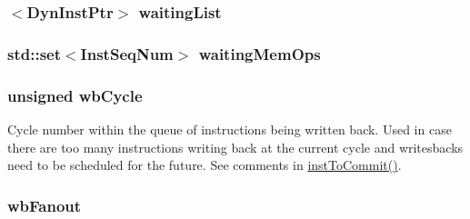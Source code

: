 \label{classLWBackEnd_a9b9600f987928599f17c3549b0de891a}
\hypertarget{classLWBackEnd_a01b09fb4e81dae8e11ca298561afebe9}{
\subsubsection[{waitingList}]{$<${\bf DynInstPtr}$>$ {\bf waitingList}}}
\label{classLWBackEnd_a01b09fb4e81dae8e11ca298561afebe9}
\hypertarget{classLWBackEnd_af9ed5543b904bf082a41d640654588e5}{
\subsubsection[{waitingMemOps}]{\setlength{\rightskip}{0pt plus 5cm}std::set$<${\bf InstSeqNum}$>$ {\bf waitingMemOps}}}
\label{classLWBackEnd_af9ed5543b904bf082a41d640654588e5}
\hypertarget{classLWBackEnd_ad2c7b2687f864f2b7359eb393276996f}{
\subsubsection[{wbCycle}]{\setlength{\rightskip}{0pt plus 5cm}unsigned {\bf wbCycle}}}
\label{classLWBackEnd_ad2c7b2687f864f2b7359eb393276996f}
Cycle number within the queue of instructions being written back. Used in case there are too many instructions writing back at the current cycle and writesbacks need to be scheduled for the future. See comments in \hyperlink{classLWBackEnd_a720e9865ffa6e84b756f5ec1d1a24d94}{instToCommit()}. \hypertarget{classLWBackEnd_a667246d811337454bc9ceccf8bbf8f1c}{
\subsubsection[{wbFanout}]{ {\bf wbFanout}}}
